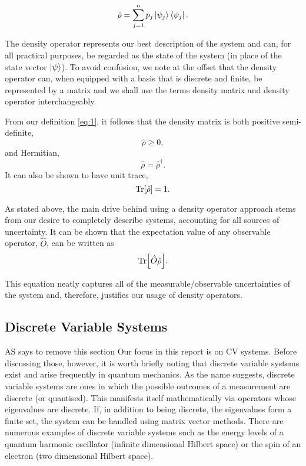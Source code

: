 \documentclass[11pt,a4paper]{article}
\numberwithin{equation}{section}
\begin{document}
	\begin{equation} \label{eq:1}
	\hat{\rho} = \sum_{j=1}^{n} p_j \ket{\psi_j}\bra{\psi_j}.
	\end{equation}
	
	The density operator represents our best description of the system and can, for all practical purposes, be regarded as the state of the system (in place of the state vector $\ket{\psi}$). To avoid confusion, we note at the offset that the density operator can, when equipped with a basis that is discrete and finite, be represented by a matrix and we shall use the terms density matrix and density operator interchangeably.
	
	From our definition \ref{eq:1}, it follows that the density matrix is both positive semi-definite, 
	\begin{equation} \label{eq:2}
	\hat{\rho} \geq 0,
	\end{equation}
	and Hermitian,
	\begin{equation} \label{eq:3}
	\hat{\rho} = \hat{\rho}^\dagger .
	\end{equation}
	It can also be shown to have unit trace, 
	\begin{equation} \label{eq:4}
	\Tr[\hat{\rho}] = 1.
	\end{equation}
	
	As stated above, the main drive behind using a density operator approach stems from our desire to completely describe systems, accounting for all sources of uncertainty. It can be shown that the expectation value of any observable operator, $\hat{O}$, can be written as
	\begin{equation} \label{eq:5}
	\Tr[\hat{O}\hat{\rho}].
	\end{equation}
	
	This equation neatly captures all of the measurable/observable uncertainties of the system and, therefore, justifies our usage of density operators.
	
	\subsection{Discrete Variable Systems}
	\color{red}AS says to remove this section \color{black}Our focus in this report is on CV systems. Before discussing those, however, it is worth briefly noting that discrete variable systems exist and arise frequently in quantum mechanics. As the name suggests, discrete variable systems are ones in which the possible outcomes of a measurement are discrete (or quantised). This manifests itself mathematically via operators whose eigenvalues are discrete. If, in addition to being discrete, the eigenvalues form a finite set, the system can be handled using matrix vector methods. There are numerous examples of discrete variable systems such as \color{red} the energy levels of a quantum harmonic oscillator (infinite dimensional Hilbert space) or \color{black}the spin of an electron (two dimensional Hilbert space).
	
\end{document}
